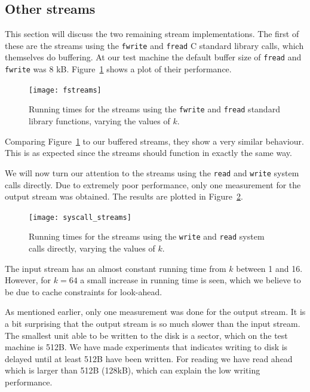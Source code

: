 \documentclass[a4paper,12pt]{article}
\begin{document}
\subsection{Other streams}
\label{sec:other-streams}
This section will discuss the two remaining stream
implementations. The first of these are the streams using the
\texttt{fwrite} and \texttt{fread} C standard library calls, which
themselves do buffering. At our test machine the default buffer size
of \texttt{fread} and \texttt{fwrite} was 8
kB. Figure~\ref{fig:fstreams} shows a plot of their performance.

\begin{figure}[h!]
  \centering
  \texttt{[image: fstreams]}
  \caption{Running times for the streams using the \texttt{fwrite} and
    \texttt{fread} standard library functions, varying the values of
    $k$.}
  \label{fig:fstreams}
\end{figure}

Comparing Figure~\ref{fig:fstreams} to our buffered streams, they show
a very similar behaviour. This is as expected since the streams
should function in exactly the same way.

We will now turn our attention to the streams using the \texttt{read}
and \texttt{write} system calls directly. Due to extremely poor
performance, only one measurement for the output stream was
obtained. The results are plotted in Figure~\ref{fig:syscall-streams}.

\begin{figure}[h!]
  \centering
  \texttt{[image: syscall\_streams]}
  \caption{Running times for the streams using the \texttt{write} and
    \texttt{read} system calls directly, varying the values of $k$.}
  \label{fig:syscall-streams}
\end{figure}

The input stream has an almost constant running time from $k$ between
1 and 16. However, for $k = 64$ a small increase in running time is
seen, which we believe to be due to cache constraints for look-ahead.

As mentioned earlier, only one measurement was done for the output
stream. It is a bit surprising that the output stream is so much
slower than the input stream. The smallest unit able to be written to
the disk is a sector, which on the test machine is 512B.  We have made experiments that indicates writing to disk is delayed until at least 512B have been
written. For reading we have read ahead which is larger than 512B (128kB), which can explain the
low writing performance.
\end{document}

